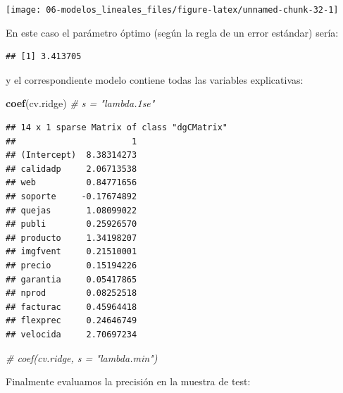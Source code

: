 \documentclass[
]{book}
\newenvironment{Shaded}{\begin{snugshade}}{\end{snugshade}}
\newcommand{\CommentTok}[1]{\textcolor[rgb]{0.56,0.35,0.01}{\textit{#1}}}
\newcommand{\FloatTok}[1]{\textcolor[rgb]{0.00,0.00,0.81}{#1}}
\newcommand{\KeywordTok}[1]{\textcolor[rgb]{0.13,0.29,0.53}{\textbf{#1}}}
\newcommand{\NormalTok}[1]{#1}
\newcommand{\OperatorTok}[1]{\textcolor[rgb]{0.81,0.36,0.00}{\textbf{#1}}}
\theoremstyle{break}
\theoremstyle{definition}
\theoremstyle{definition}
\theoremstyle{definition}
\theoremstyle{remark}
\begin{document}
\begin{center}\texttt{[image: 06-modelos\_lineales\_files/figure-latex/unnamed-chunk-32-1]} \end{center}

En este caso el parámetro óptimo (según la regla de un error estándar) sería:

\begin{Shaded}
\end{Shaded}

\begin{verbatim}
## [1] 3.413705
\end{verbatim}

\begin{Shaded}
\end{Shaded}

y el correspondiente modelo contiene todas las variables explicativas:

\begin{Shaded}
\begin{Highlighting}[]
\KeywordTok{coef}\NormalTok{(cv.ridge) }\CommentTok{# s = "lambda.1se"}
\end{Highlighting}
\end{Shaded}

\begin{verbatim}
## 14 x 1 sparse Matrix of class "dgCMatrix"
##                       1
## (Intercept)  8.38314273
## calidadp     2.06713538
## web          0.84771656
## soporte     -0.17674892
## quejas       1.08099022
## publi        0.25926570
## producto     1.34198207
## imgfvent     0.21510001
## precio       0.15194226
## garantia     0.05417865
## nprod        0.08252518
## facturac     0.45964418
## flexprec     0.24646749
## velocida     2.70697234
\end{verbatim}

\begin{Shaded}
\begin{Highlighting}[]
\CommentTok{# coef(cv.ridge, s = "lambda.min")}
\end{Highlighting}
\end{Shaded}

Finalmente evaluamos la precisión en la muestra de test:
\end{document}

